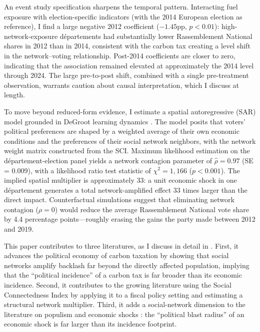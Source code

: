 \documentclass[12pt]{article}
\newcommand{\rn}{Rassemblement National}
\newcommand{\dept}{d\'{e}partement}
\newcommand{\depts}{d\'{e}partements}
\begin{document}
An event study specification sharpens the temporal pattern. Interacting fuel exposure with election-specific indicators (with the 2014 European election as reference), I find a large negative 2012 coefficient ($-1.45$pp, $p < 0.01$): high-network-exposure \depts{} had substantially lower \rn{} shares in 2012 than in 2014, consistent with the carbon tax creating a level shift in the network--voting relationship. Post-2014 coefficients are closer to zero, indicating that the association remained elevated at approximately the 2014 level through 2024. The large pre-to-post shift, combined with a single pre-treatment observation, warrants caution about causal interpretation, which I discuss at length.

To move beyond reduced-form evidence, I estimate a spatial autoregressive (SAR) model grounded in DeGroot learning dynamics \citep{degroot1974reaching, golub2010naive}. The model posits that voters' political preferences are shaped by a weighted average of their own economic conditions and the preferences of their social network neighbors, with the network weight matrix constructed from the SCI. Maximum likelihood estimation on the \dept{}-election panel yields a network contagion parameter of $\hat{\rho} = 0.97$ (SE = 0.009), with a likelihood ratio test statistic of $\chi^2 = 1{,}166$ ($p < 0.001$). The implied spatial multiplier is approximately 33: a unit economic shock in one \dept{} generates a total network-amplified effect 33 times larger than the direct impact. Counterfactual simulations suggest that eliminating network contagion ($\rho = 0$) would reduce the average \rn{} vote share by 4.4 percentage points---roughly erasing the gains the party made between 2012 and 2019.

This paper contributes to three literatures, as I discuss in detail in . First, it advances the political economy of carbon taxation by showing that social networks amplify backlash far beyond the directly affected population, implying that the ``political incidence'' of a carbon tax is far broader than its economic incidence. Second, it contributes to the growing literature using the Social Connectedness Index \citep{bailey2018social, chetty2022social1} by applying it to a fiscal policy setting and estimating a structural network multiplier. Third, it adds a social-network dimension to the literature on populism and economic shocks \citep{colantone2018trade, fetzer2019did, funke2016going}: the ``political blast radius'' of an economic shock is far larger than its incidence footprint.
\end{document}
